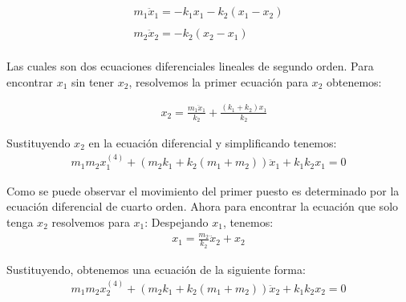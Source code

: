 \documentclass{article}
\begin{document}
\begin{equation}
\begin{aligned}
\\m_1\ddot x_1= -k_1x_1-k_2(x_1-x_2)\\
\\m_2\ddot x_2= -k_2(x_2-x_1)\\
\end{aligned}
\end{equation}

Las cuales son dos ecuaciones diferenciales lineales de segundo orden. Para encontrar $x_1$ sin tener $x_2$, resolvemos la primer ecuación para $x_2$ obtenemos:

\begin{equation}
\begin{aligned}
\quad x_2=\frac{m_1\ddot x_1}{k_2}+\frac{(k_1+k_2)x_1}{k_2}
\end{aligned}
\end{equation}

Sustituyendo $x_2$ en la ecuación diferencial y simplificando tenemos:
\begin{equation}
\begin{aligned}
m_1m_2x_{1}^{(4)}+(m_2k_1+k_2(m_1+m_2))\ddot x_1+k_1k_2x_1=0
\end{aligned}
\end{equation}

Como se puede observar el movimiento del primer puesto es determinado por la ecuación diferencial de cuarto orden. Ahora para encontrar la ecuación que solo tenga $x_2$ resolvemos para $x_1$:
\newline
Despejando $x_1$, tenemos:
\begin{equation}
\begin{aligned}
x_1=\frac{m_2}{k_2}\ddot x_2+ x_2
\end{aligned}
\end{equation}


Sustituyendo, obtenemos una ecuación de la siguiente forma:
\begin{equation}
\begin{aligned}
m_1m_2x_{2}^{(4)}+(m_2k_1+k_2(m_1+m_2))\ddot x_2+k_1k_2x_2=0
\end{aligned}
\end{equation}
\end{document}
